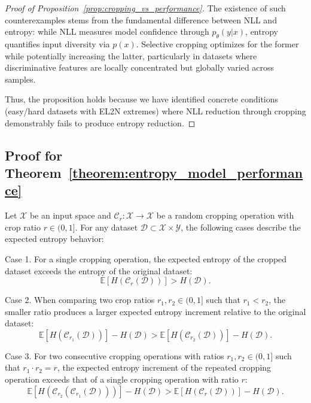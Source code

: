 \begin{proof}[Proof of Proposition~\ref{prop:cropping_vs_performance}]
The existence of such counterexamples stems from the fundamental difference between NLL and entropy: while NLL measures model confidence through $p_\theta(y|x)$, entropy quantifies input diversity via $p(x)$. Selective cropping optimizes for the former while potentially increasing the latter, particularly in datasets where discriminative features are locally concentrated but globally varied across samples.

Thus, the proposition holds because we have identified concrete conditions (easy/hard datasets with EL2N extremes) where NLL reduction through cropping demonstrably fails to produce entropy reduction.
\end{proof}






\subsection{Proof for Theorem~\ref{theorem:entropy_model_performance}}
\label{proof:thm}

\begin{assumption}
\label{assumption:entropy_increment_cropping}
Let \( \mathcal{X} \) be an input space and \( \mathcal{C}_r: \mathcal{X} \rightarrow \mathcal{X} \) be a random cropping operation with crop ratio \( r \in (0, 1] \). For any dataset \( \mathcal{D} \subset \mathcal{X} \times \mathcal{Y} \), the following cases describe the expected entropy behavior:

Case 1. For a single cropping operation, the expected entropy of the cropped dataset exceeds the entropy of the original dataset:
\[
\mathbb{E}[H(\mathcal{C}_r(\mathcal{D}))] > H(\mathcal{D}).
\]

Case 2. When comparing two crop ratios \( r_1, r_2 \in (0, 1] \) such that \( r_1 < r_2 \), the smaller ratio produces a larger expected entropy increment relative to the original dataset:
\[
\mathbb{E}[H(\mathcal{C}_{r_1}(\mathcal{D}))] - H(\mathcal{D}) > \mathbb{E}[H(\mathcal{C}_{r_2}(\mathcal{D}))] - H(\mathcal{D}).
\]

Case 3. For two consecutive cropping operations with ratios \( r_1, r_2 \in (0, 1] \) such that \( r_1 \cdot r_2 = r \), the expected entropy increment of the repeated cropping operation exceeds that of a single cropping operation with ratio \( r \):
\[
\mathbb{E}[H(\mathcal{C}_{r_2}(\mathcal{C}_{r_1}(\mathcal{D})))] - H(\mathcal{D}) > \mathbb{E}[H(\mathcal{C}_r(\mathcal{D}))] - H(\mathcal{D}).
\]
\end{assumption}

